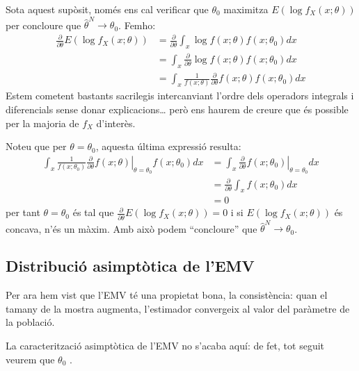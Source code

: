 \documentclass[letterpaper,10pt,english]{sphinxmanual}
\begin{document}
Sota aquest supòsit, només ens cal verificar que \(\theta_0\) maximitza
\(E(\log f_X(x; \theta))\) per concloure que \(\hat{\theta}^N \to \theta_0\).
Fem\sphinxhyphen{}ho:
\begin{equation*}
\begin{split}\frac{\partial}{\partial \theta} E(\log f_X(x; \theta)) & = \frac{\partial}{\partial \theta} \int_x  \log f(x; \theta) f(x; \theta_0) dx \\
& =  \int_x  \frac{\partial}{\partial \theta}\log f(x; \theta) f(x; \theta_0) dx \\
& = \int_x  \frac{1}{f(x; \theta)} \frac{\partial}{\partial \theta} f(x; \theta) f(x; \theta_0) dx\end{split}
\end{equation*}
Estem cometent bastants sacrilegis intercanviant l’ordre dels operadors
integrals i diferencials sense donar explicacions… però ens haurem de
creure que és possible per la majoria de \(f_X\) d’interès.

Noteu que per \(\theta = \theta_0\), aquesta última expressió resulta:
\begin{equation*}
\begin{split}\int_x  \frac{1}{f(x; \theta_0)} \left.\frac{\partial}{\partial \theta} f(x; \theta) \right|_{\theta=\theta_0} f(x; \theta_0) dx & =  \int_x  \left. \frac{\partial}{\partial \theta} f(x; \theta_0) \right|_{\theta=\theta_0} dx\\
& =  \frac{\partial}{\partial \theta} \int_x   f(x; \theta_0)dx \\
& = 0\end{split}
\end{equation*}
per tant \(\theta = \theta_0\) és tal que \(\frac{\partial}{\partial \theta} E(\log f_X(x; \theta))=0\)
i si \(E(\log f_X(x; \theta))\) és concava, n’és un màxim. Amb això
podem “concloure” que \(\hat{\theta}^N \to \theta_0\).


\subsection{Distribució asimptòtica de l’EMV}
\label{\detokenize{0_Intro/0_3_Estimacio:distribucio-asimptotica-de-l-emv}}
Per ara hem vist que l’EMV té una propietat bona, la consistència: quan el tamany
de la mostra augmenta, l’estimador convergeix al valor del
paràmetre de la població.

La caracterització asimptòtica de l’EMV no s’acaba aquí: de fet,
tot seguit veurem que  \(\theta_0\) .
\end{document}
